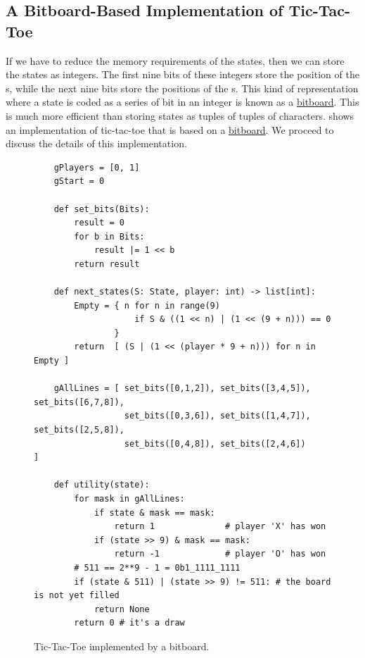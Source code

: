 \subsection{A Bitboard-Based Implementation of Tic-Tac-Toe}
If we have to reduce the memory requirements of the states, then we can store the states as integers.  The
first nine bits of these integers store the position of the s, while the next nine bits store the
positions of the s.  This kind of representation where a state is coded as a series of bit in an
integer is known as a \href{https://en.wikipedia.org/wiki/Bitboard}{bitboard}.  This is much
more efficient than storing states as 
tuples of tuples of characters.   shows an implementation of tic-tac-toe that
is based on a \href{https://en.wikipedia.org/wiki/Bitboard}{bitboard}.  We proceed to discuss the details of
this implementation.

\begin{figure}[!ht]
\centering
\begin{verbatim}
    gPlayers = [0, 1]
    gStart = 0
    
    def set_bits(Bits):
        result = 0
        for b in Bits:
            result |= 1 << b
        return result

    def next_states(S: State, player: int) -> list[int]:
        Empty = { n for n in range(9) 
                    if S & ((1 << n) | (1 << (9 + n))) == 0 
                }
        return  [ (S | (1 << (player * 9 + n))) for n in Empty ]               

    gAllLines = [ set_bits([0,1,2]), set_bits([3,4,5]), set_bits([6,7,8]), 
                  set_bits([0,3,6]), set_bits([1,4,7]), set_bits([2,5,8]), 
                  set_bits([0,4,8]), set_bits([2,4,6])                     ]

    def utility(state):
        for mask in gAllLines:
            if state & mask == mask:
                return 1              # player 'X' has won
            if (state >> 9) & mask == mask:
                return -1             # player 'O' has won
        # 511 == 2**9 - 1 = 0b1_1111_1111  
        if (state & 511) | (state >> 9) != 511: # the board is not yet filled
            return None
        return 0 # it's a draw
\end{verbatim}
\vspace*{-0.3cm}
\caption{Tic-Tac-Toe implemented by a bitboard.}
\label{fig:Tic-Tac-Toe-Bitboard.ipynb}
\end{figure}


